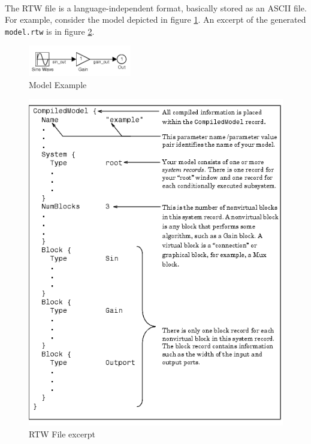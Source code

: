 \paragraph{} The RTW file is a language-independent format, basically stored as an ASCII file. For example, consider the model depicted in figure \ref{fig:RTWModelExample}. An excerpt of the generated \verb|model.rtw| is in figure \ref{fig:RTWFileExample}.

\begin{figure}[htbp] 
\centering    
\includegraphics[width=0.4\textwidth]{RTWModelExample}
\caption{Model Example}
\label{fig:RTWModelExample}
\end{figure}

\begin{figure}[htbp] 
\centering    
\includegraphics[width=1.0\textwidth]{RTWFileExample}
\caption{RTW File excerpt}
\label{fig:RTWFileExample}
\end{figure}

